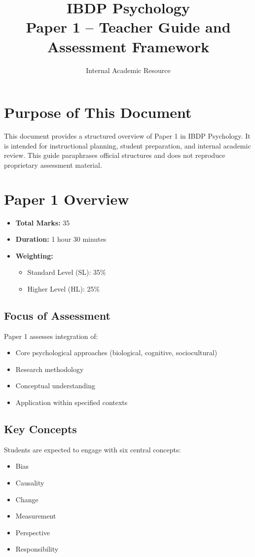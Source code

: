 \documentclass[12pt,a4paper]{article}
\title{\textbf{IBDP Psychology \\ Paper 1 – Teacher Guide and Assessment Framework}}
\author{Internal Academic Resource}
\date{}
\begin{document}
\maketitle
\thispagestyle{empty}

\vspace{1cm}

\section*{Purpose of This Document}
This document provides a structured overview of Paper 1 in IBDP Psychology. 
It is intended for instructional planning, student preparation, and internal academic review. 
This guide paraphrases official structures and does not reproduce proprietary assessment material.

\newpage

\section{Paper 1 Overview}

\begin{itemize}
    \item \textbf{Total Marks:} 35
    \item \textbf{Duration:} 1 hour 30 minutes
    \item \textbf{Weighting:} 
    \begin{itemize}
        \item Standard Level (SL): 35\%
        \item Higher Level (HL): 25\%
    \end{itemize}
\end{itemize}

\subsection*{Focus of Assessment}
Paper 1 assesses integration of:
\begin{itemize}
    \item Core psychological approaches (biological, cognitive, sociocultural)
    \item Research methodology
    \item Conceptual understanding
    \item Application within specified contexts
\end{itemize}

\subsection*{Key Concepts}
Students are expected to engage with six central concepts:
\begin{itemize}
    \item Bias
    \item Causality
    \item Change
    \item Measurement
    \item Perspective
    \item Responsibility
\end{itemize}
\end{document}
